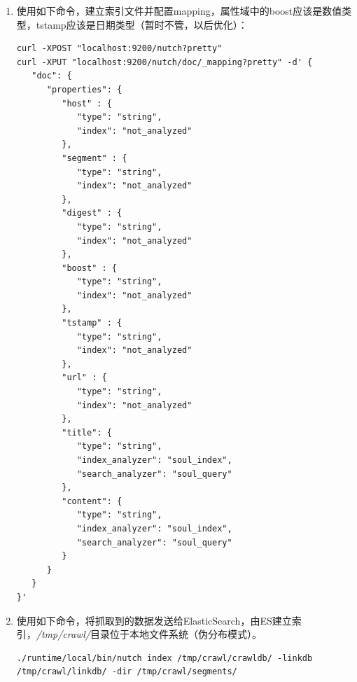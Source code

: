 \begin{enumerate}[(1)]
\begin{verbatim}
  <property>
    <name>http.agent.name</name>
    <value>soul_seg</value>
    <description></description>
  </property>

  <property>
    <name>http.robots.agents</name>
    <value>soul_seg,*</value>
    <description></description>
  </property>

  <property>
    <name>http.content.limit</name>
    <value>-1</value>
    <description>设置content长度为无穷大，用于设置http协议，还有个file.content.limit用于设置本地文件的最大allow长度。</description>
  </property>

  <property>
    <name>http.verbose</name>
    <value>true</value>
    <description>If true, HTTP will log more verbosely</description>
  </property>
  <property>
    <name>parser.timeout</name>
    <value>-1</value>
  </property>
</configuration>
\end{verbatim}
\item 使用如下命令，建立索引文件并配置mapping，属性域中的boost应该是数值类型，tstamp应该是日期类型（暂时不管，以后优化）：
\begin{verbatim}
curl -XPOST "localhost:9200/nutch?pretty"
curl -XPUT "localhost:9200/nutch/doc/_mapping?pretty" -d' {
   "doc": {
      "properties": {
         "host" : {
            "type": "string",
            "index": "not_analyzed"           
         },
         "segment" : {
            "type": "string",
            "index": "not_analyzed"           
         },
         "digest" : {
            "type": "string",
            "index": "not_analyzed"           
         },
         "boost" : {
            "type": "string",
            "index": "not_analyzed"           
         },
         "tstamp" : {
            "type": "string",
            "index": "not_analyzed"           
         },
         "url" : {
            "type": "string",
            "index": "not_analyzed"           
         },
         "title": {
            "type": "string",
            "index_analyzer": "soul_index",
            "search_analyzer": "soul_query"
         },
         "content": {
            "type": "string",
            "index_analyzer": "soul_index",
            "search_analyzer": "soul_query"
         }
      }
   }
}'
\end{verbatim}
\item 使用如下命令，将抓取到的数据发送给ElasticSearch，由ES建立索引，\textsl{/tmp/crawl/}目录位于本地文件系统（伪分布模式）。
\begin{verbatim}
./runtime/local/bin/nutch index /tmp/crawl/crawldb/ -linkdb /tmp/crawl/linkdb/ -dir /tmp/crawl/segments/

\end{verbatim}
\end{enumerate}
